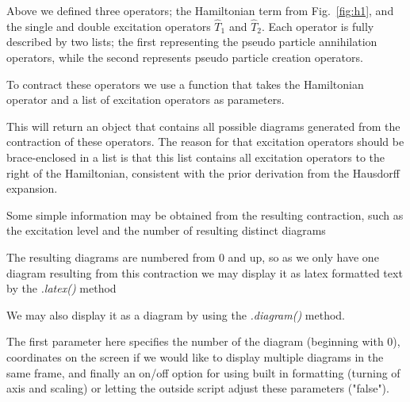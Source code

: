 Above we defined three operators; the Hamiltonian term from Fig.~\ref{fig:h1}, 
and the single and double excitation operators
$\hat{T}_1$ and $\hat{T}_2$. Each operator is fully described by two
lists; the first representing the pseudo particle annihilation
operators, while the second represents pseudo particle creation
operators.

To contract these operators we use a function that takes the
Hamiltonian operator and a list of excitation operators as parameters.

\begin{minipage}{\linewidth}
\end{minipage}

This will return an object that contains all possible diagrams
generated from the contraction of these operators. The reason for that
excitation operators should be brace-enclosed in a list is that this
list contains all excitation operators to the right of the
Hamiltonian, consistent with the prior derivation from the Hausdorff
expansion.

Some simple information may be obtained from the resulting
contraction, such as the excitation level and the number of resulting
distinct diagrams

\begin{minipage}{\linewidth}
\end{minipage}

The resulting diagrams are numbered from 0 and up, so as we only have
one diagram resulting from this contraction we may display it as latex
formatted text by the \emph{.latex()} method

\begin{minipage}{\linewidth}
\end{minipage}

We may also display it as a diagram by using the \emph{.diagram()} method.

\begin{minipage}{\linewidth}
\end{minipage}

The first parameter here specifies the number of the diagram
(beginning with 0), coordinates on the screen if we would like to
display multiple diagrams in the same frame, and finally an on/off
option for using built in formatting (turning of axis and scaling) or
letting the outside script adjust these parameters ("false").

